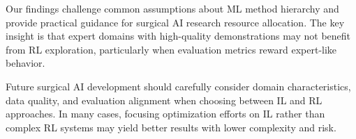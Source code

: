 \documentclass[runningheads]{llncs}
\begin{document}
Our findings challenge common assumptions about ML method hierarchy and provide practical guidance for surgical AI research resource allocation. The key insight is that expert domains with high-quality demonstrations may not benefit from RL exploration, particularly when evaluation metrics reward expert-like behavior.

Future surgical AI development should carefully consider domain characteristics, data quality, and evaluation alignment when choosing between IL and RL approaches. In many cases, focusing optimization efforts on IL rather than complex RL systems may yield better results with lower complexity and risk.



\end{document}
